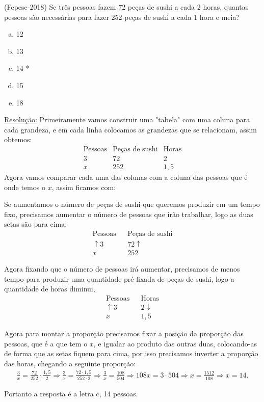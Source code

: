 \begin{exem}
  (Fepese-2018) Se três pessoas fazem 72 peças de sushi a cada 2 horas, quantas pessoas são necessárias para fazer 252 peças de sushi a cada 1 hora e meia?
  \begin{enumerate}[a)]
  \item 12
  \item 13
  \item 14 *
  \item 15
  \item 18
  \end{enumerate}

  \underline{Resolução:}
  Primeiramente vamos construir uma "tabela" com uma coluna para cada grandeza, e em cada linha colocamos as grandezas que se relacionam, assim obtemos:
  \begin{eqnarray*}
   \text{Pessoas} & \text{Peças de sushi} & \text{Horas} \\
   3  & 72 & 2  \\
   x  & 252 & 1,5
  \end{eqnarray*}
  Agora vamos comparar cada uma das colunas com a coluna das pessoas que é onde temos o $x$, assim ficamos com:

  Se aumentamos o número de peças de sushi que queremos produzir em um tempo fixo, precisamos aumentar o número de pessoas que irão trabalhar, logo as duas setas são para cima:
  \begin{eqnarray*}
  \text{Pessoas} & & \text{Peças de sushi}  \\
   \uparrow 3 &  & 72 \uparrow  \\
   x &  & 252
  \end{eqnarray*}

  Agora fixando que o número de pessoas irá aumentar, precisamos de menos tempo para produzir uma quantidade pré-fixada de peças de sushi, logo a quantidade de horas diminui,
  \begin{eqnarray*}
   \text{Pessoas} & & \text{Horas} \\
   \uparrow3 & & 2 \downarrow  \\
   x & & 1,5
  \end{eqnarray*}

  Agora para montar a proporção precisamos fixar a posição da proporção das pessoas, que é a que tem o $x$, e igualar ao produto das outras duas, colocando-as de forma que as setas fiquem para cima, por isso precisamos inverter a proporção das horas, chegando a seguinte proporção:
  \begin{eqnarray*}
   \frac{3}{x}= \frac{72}{252} \cdot \frac{1,5}{2} \Rightarrow \frac{3}{x}=\frac{72\cdot 1,5}{252 \cdot 2} \Rightarrow \frac{3}{x}=\frac{108}{504} \Rightarrow 108 x= 3 \cdot 504 \Rightarrow x=\frac{1512}{108} \Rightarrow x=14.
  \end{eqnarray*}

  Portanto a resposta é a letra c, 14 pessoas.
  \fim
\end{exem}

